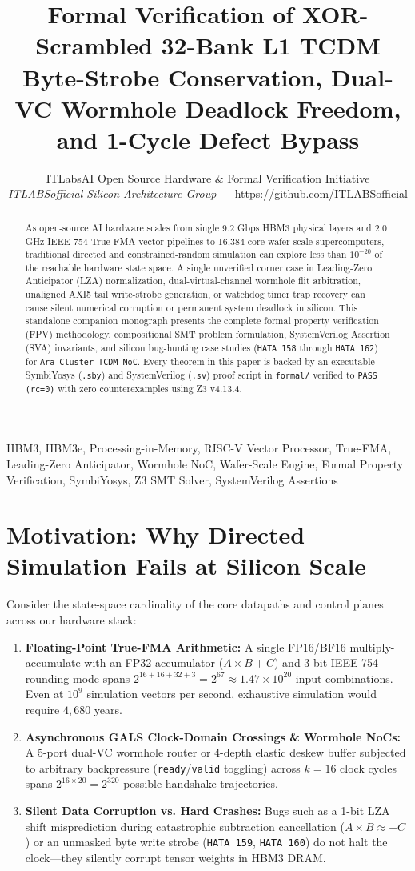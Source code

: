 \documentclass[journal,10pt,twocolumn]{IEEEtran}
\title{Formal Verification of XOR-Scrambled 32-Bank L1 TCDM Byte-Strobe Conservation, Dual-VC Wormhole Deadlock Freedom, and 1-Cycle Defect Bypass}
\author{ITLabsAI Open Source Hardware \& Formal Verification Initiative\\
\textit{ITLABSofficial Silicon Architecture Group} --- \url{https://github.com/ITLABSofficial}}
\begin{document}
\maketitle
\begin{abstract}
As open-source AI hardware scales from single 9.2 Gbps HBM3 physical layers and 2.0 GHz IEEE-754 True-FMA vector pipelines to 16,384-core wafer-scale supercomputers, traditional directed and constrained-random simulation can explore less than $10^{-20}$ of the reachable hardware state space. A single unverified corner case in Leading-Zero Anticipator (LZA) normalization, dual-virtual-channel wormhole flit arbitration, unaligned AXI5 tail write-strobe generation, or watchdog timer trap recovery can cause silent numerical corruption or permanent system deadlock in silicon. This standalone companion monograph presents the complete formal property verification (FPV) methodology, compositional SMT problem formulation, SystemVerilog Assertion (SVA) invariants, and silicon bug-hunting case studies (\texttt{HATA 158} through \texttt{HATA 162}) for \texttt{Ara\_Cluster\_TCDM\_NoC}. Every theorem in this paper is backed by an executable SymbiYosys (\texttt{.sby}) and SystemVerilog (\texttt{.sv}) proof script in \texttt{formal/} verified to \texttt{PASS (rc=0)} with zero counterexamples using Z3 v4.13.4.
\end{abstract}
\begin{IEEEkeywords}
HBM3, HBM3e, Processing-in-Memory, RISC-V Vector Processor, True-FMA, Leading-Zero Anticipator, Wormhole NoC, Wafer-Scale Engine, Formal Property Verification, SymbiYosys, Z3 SMT Solver, SystemVerilog Assertions
\end{IEEEkeywords}


\section{Motivation: Why Directed Simulation Fails at Silicon Scale}

Consider the state-space cardinality of the core datapaths and control planes across our hardware stack:
\begin{enumerate}
  \item \textbf{Floating-Point True-FMA Arithmetic:} A single FP16/BF16 multiply-accumulate with an FP32 accumulator ($A \times B + C$) and 3-bit IEEE-754 rounding mode spans $2^{16+16+32+3} = 2^{67} \approx 1.47 \times 10^{20}$ input combinations. Even at $10^9$ simulation vectors per second, exhaustive simulation would require $4,680$ years.
  \item \textbf{Asynchronous GALS Clock-Domain Crossings \& Wormhole NoCs:} A 5-port dual-VC wormhole router or 4-depth elastic deskew buffer subjected to arbitrary backpressure (\texttt{ready}/\texttt{valid} toggling) across $k=16$ clock cycles spans $2^{16 \times 20} = 2^{320}$ possible handshake trajectories.
  \item \textbf{Silent Data Corruption vs. Hard Crashes:} Bugs such as a 1-bit LZA shift misprediction during catastrophic subtraction cancellation ($A \times B \approx -C$) or an unmasked byte write strobe (\texttt{HATA 159}, \texttt{HATA 160}) do not halt the clock—they silently corrupt tensor weights in HBM3 DRAM.
\end{enumerate}
\end{document}
